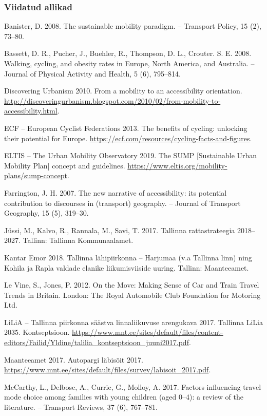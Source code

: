 \documentclass[estonian,]{article}
\begin{document}
\hypertarget{viidatud-allikad-5}{%
\subsubsection*{Viidatud allikad}\label{viidatud-allikad-5}}

Banister, D. 2008. The sustainable mobility paradigm. -- Transport Policy, 15 (2), 73--80.

Bassett, D. R., Pucher, J., Buehler, R., Thompson, D. L., Crouter. S. E. 2008. Walking, cycling, and obesity rates in Europe, North America, and Australia. -- Journal of Physical Activity and Health, 5 (6), 795--814.

Discovering Urbanism 2010. From a mobility to an accessibility orientation. \url{http://discoveringurbanism.blogspot.com/2010/02/from-mobility-to-accessibility.html}.

ECF -- European Cyclist Federations 2013. The benefits of cycling: unlocking their potential for Europe. \url{https://ecf.com/resources/cycling-facts-and-figures}.

ELTIS -- The Urban Mobility Observatory 2019. The SUMP {[}Sustainable Urban Mobility Plan{]} concept and guidelines. \url{https://www.eltis.org/mobility-plans/sump-concept}.

Farrington, J. H. 2007. The new narrative of accessibility: its potential contribution to discourses in (transport) geography. -- Journal of Transport Geography, 15 (5), 319--30.

Jüssi, M., Kalvo, R., Rannala, M., Savi, T. 2017. Tallinna rattastrateegia 2018--2027. Tallinn: Tallinna Kommunaalamet.

Kantar Emor 2018. Tallinna lähipiirkonna -- Harjumaa (v.a Tallinna linn) ning Kohila ja Rapla valdade elanike liikumisviiside uuring. Tallinn: Maanteeamet.

Le Vine, S., Jones, P. 2012. On the Move: Making Sense of Car and Train Travel Trends in Britain. London: The Royal Automobile Club Foundation for Motoring Ltd.

LiLiA -- Tallinna piirkonna säästva linnaliikuvuse arengukava 2017. Tallinna LiLia 2035. Kontseptsioon. \url{https://www.mnt.ee/sites/default/files/content-editors/Failid/Yldine/talilia_kontseptsioon_juuni2017.pdf}.

Maanteeamet 2017. Autopargi läbisõit 2017. \url{https://www.mnt.ee/sites/default/files/survey/labisoit_2017.pdf}.

McCarthy, L., Delbosc, A., Currie, G., Molloy, A. 2017. Factors influencing travel mode choice among families with young children (aged 0--4): a review of the literature. -- Transport Reviews, 37 (6), 767--781.
\end{document}
